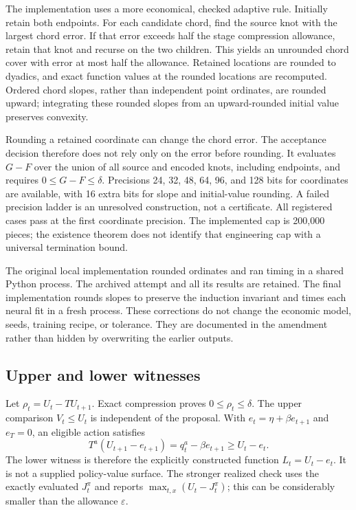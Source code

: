 The implementation uses a more economical, checked adaptive rule. Initially retain both endpoints. For each candidate chord, find the source knot with the largest chord error. If that error exceeds half the stage compression allowance, retain that knot and recurse on the two children. This yields an unrounded chord cover with error at most half the allowance. Retained locations are rounded to dyadics, and exact function values at the rounded locations are recomputed. Ordered chord slopes, rather than independent point ordinates, are rounded upward; integrating these rounded slopes from an upward-rounded initial value preserves convexity.

Rounding a retained coordinate can change the chord error. The acceptance decision therefore does not rely only on the error before rounding. It evaluates $G-F$ over the union of all source and encoded knots, including endpoints, and requires $0\le G-F\le\delta$. Precisions 24, 32, 48, 64, 96, and 128 bits for coordinates are available, with 16 extra bits for slope and initial-value rounding. A failed precision ladder is an unresolved construction, not a certificate. All registered cases pass at the first coordinate precision. The implemented cap is 200,000 pieces; the existence theorem does not identify that engineering cap with a universal termination bound.

The original local implementation rounded ordinates and ran timing in a shared Python process. The archived attempt and all its results are retained. The final implementation rounds slopes to preserve the induction invariant and times each neural fit in a fresh process. These corrections do not change the economic model, seeds, training recipe, or tolerance. They are documented in the amendment rather than hidden by overwriting the earlier outputs.

\subsection{Upper and lower witnesses}
Let $\rho_t=U_t-TU_{t+1}$. Exact compression proves $0\le\rho_t\le\delta$. The upper comparison $V_t\le U_t$ is independent of the proposal. With $e_t=\eta+\beta e_{t+1}$ and $e_T=0$, an eligible action satisfies
\[
 T^a(U_{t+1}-e_{t+1})=q_t^a-\beta e_{t+1}\ge U_t-e_t.
\]
The lower witness is therefore the explicitly constructed function $L_t=U_t-e_t$. It is not a supplied policy-value surface. The stronger realized check uses the exactly evaluated $J_t^\pi$ and reports $\max_{t,x}(U_t-J_t^\pi)$; this can be considerably smaller than the allowance $\varepsilon$.

